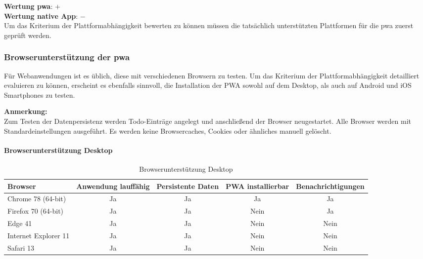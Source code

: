 \textbf{Wertung \ac{pwa}}: $+$ \\
\textbf{Wertung native App}: $-$  \\

Um das Kriterium der Plattformabhängigkeit bewerten zu können müssen die tatsächlich unterstützten Plattformen für die \ac{pwa} zuerst geprüft werden.

\subsubsection{Browserunterstützung der \acs{pwa}}
Für Webanwendungen ist es üblich, diese mit verschiedenen Browsern zu testen. Um das Kriterium der Plattformabhängigkeit detailliert evaluieren zu können, erscheint es ebenfalls sinnvoll, die Installation der PWA sowohl auf dem Desktop, als auch auf Android und iOS Smartphones zu testen.

\textbf{Anmerkung:}\\
Zum Testen der Datenpersistenz werden Todo-Einträge angelegt und anschließend der Browser neugestartet.
Alle Browser werden mit Standardeinstellungen ausgeführt. Es werden keine Browsercaches, Cookies oder ähnliches manuell gelöscht.

\paragraph{Browserunterstützung Desktop}
\begin{table}[H]
	\centering
	\begin{tabularx}{\textwidth}{|l||C|C|C|c|}
		\hline
		Browser              & Anwendung lauffähig & Persistente Daten & PWA installierbar & Benachrichtigungen \\
		\hline
		Chrome 78 (64-bit)   & Ja                  & Ja                & Ja                & Ja                 \\
		Firefox 70 (64-bit)  & Ja                  & Ja                & Nein              & Ja                 \\
		Edge 41    & Ja                  & Ja                & Nein              & Nein               \\
		Internet Explorer 11 & Ja                  & Ja                & Nein              & Nein               \\
		Safari 13            & Ja                  & Ja                & Nein              & Nein               \\
		\hline
	\end{tabularx}
	\caption{Browserunterstützung Desktop} \label{tab:browser_desktop}
\end{table}

